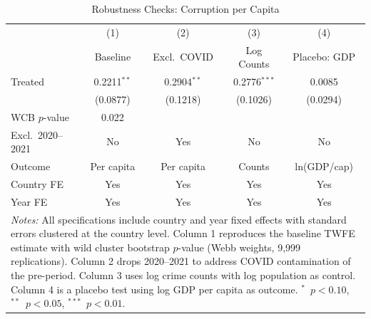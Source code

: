 \begin{table}[htbp]
\centering
\caption{Robustness Checks: Corruption per Capita}
\label{tab:robustness}
\begin{tabular}{lcccc}
\hline\hline
 & (1) & (2) & (3) & (4) \\
 & Baseline & Excl.\ COVID & Log Counts & Placebo: GDP \\
\hline
Treated & 0.2211$^{**}$ & 0.2904$^{**}$ & 0.2776$^{***}$ & 0.0085 \\
 & (0.0877) & (0.1218) & (0.1026) & (0.0294) \\
WCB $p$-value & 0.022 & & & \\
\hline
Excl.\ 2020--2021 & No & Yes & No & No \\
Outcome & Per capita & Per capita & Counts & ln(GDP/cap) \\
Country FE & Yes & Yes & Yes & Yes \\
Year FE & Yes & Yes & Yes & Yes \\
\hline\hline
\multicolumn{5}{p{0.9\textwidth}}{\footnotesize \textit{Notes:} All specifications include country and year fixed effects with standard errors clustered at the country level. Column 1 reproduces the baseline TWFE estimate with wild cluster bootstrap $p$-value (Webb weights, 9,999 replications). Column 2 drops 2020--2021 to address COVID contamination of the pre-period. Column 3 uses log crime counts with log population as control. Column 4 is a placebo test using log GDP per capita as outcome. $^{*}$~$p<0.10$, $^{**}$~$p<0.05$, $^{***}$~$p<0.01$.} \\
\end{tabular}
\end{table}
